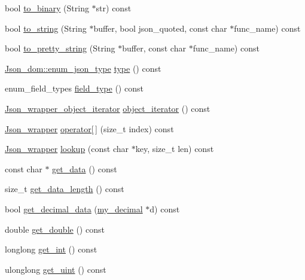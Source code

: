 \begin{DoxyCompactItemize}
bool \mbox{\hyperlink{classJson__wrapper_a1af35c5996f355434d933f1f74ae0daf}{to\+\_\+binary}} (String $\ast$str) const
\item 
bool \mbox{\hyperlink{classJson__wrapper_a37a1e80e640c7e91e01745162ad16d76}{to\+\_\+string}} (String $\ast$buffer, bool json\+\_\+quoted, const char $\ast$func\+\_\+name) const
\item 
bool \mbox{\hyperlink{classJson__wrapper_a18aec6b318d9f41120b6be3bde54144f}{to\+\_\+pretty\+\_\+string}} (String $\ast$buffer, const char $\ast$func\+\_\+name) const
\item 
\mbox{\hyperlink{classJson__dom_af37eed7dfe1da1d6507d3ab85320eb03}{Json\+\_\+dom\+::enum\+\_\+json\+\_\+type}} \mbox{\hyperlink{classJson__wrapper_a121615ea1c079dd7127990894e2154e3}{type}} () const
\item 
enum\+\_\+field\+\_\+types \mbox{\hyperlink{classJson__wrapper_a4235f2ce870d51034f491b087ec1646b}{field\+\_\+type}} () const
\item 
\mbox{\hyperlink{classJson__wrapper__object__iterator}{Json\+\_\+wrapper\+\_\+object\+\_\+iterator}} \mbox{\hyperlink{classJson__wrapper_a55e450c4ddbb6f2e9e4fcb4e4bf339e7}{object\+\_\+iterator}} () const
\item 
\mbox{\hyperlink{classJson__wrapper}{Json\+\_\+wrapper}} \mbox{\hyperlink{classJson__wrapper_a5d65ee3ef4ba89a3be9da615b056ea14}{operator\mbox{[}$\,$\mbox{]}}} (size\+\_\+t index) const
\item 
\mbox{\hyperlink{classJson__wrapper}{Json\+\_\+wrapper}} \mbox{\hyperlink{classJson__wrapper_a2b45311d7b0dd662d38d548edaff25bd}{lookup}} (const char $\ast$key, size\+\_\+t len) const
\item 
const char $\ast$ \mbox{\hyperlink{classJson__wrapper_a017b37a8d667e42bf1686a6ef172a99f}{get\+\_\+data}} () const
\item 
size\+\_\+t \mbox{\hyperlink{classJson__wrapper_a33f0cd3c6c3ecf1336b0f76a4dae65b2}{get\+\_\+data\+\_\+length}} () const
\item 
bool \mbox{\hyperlink{classJson__wrapper_a39ae6024f590182d98e8a377c9599f01}{get\+\_\+decimal\+\_\+data}} (\mbox{\hyperlink{classmy__decimal}{my\+\_\+decimal}} $\ast$d) const
\item 
double \mbox{\hyperlink{classJson__wrapper_ac7744701e254af761345535abf8cedd7}{get\+\_\+double}} () const
\item 
longlong \mbox{\hyperlink{classJson__wrapper_a567c33e8a8dfbc96055e603c0acbd9d4}{get\+\_\+int}} () const
\item 
ulonglong \mbox{\hyperlink{classJson__wrapper_a3ad239e5ee5b2065ae220d62aacf8204}{get\+\_\+uint}} () const

\end{DoxyCompactItemize}
